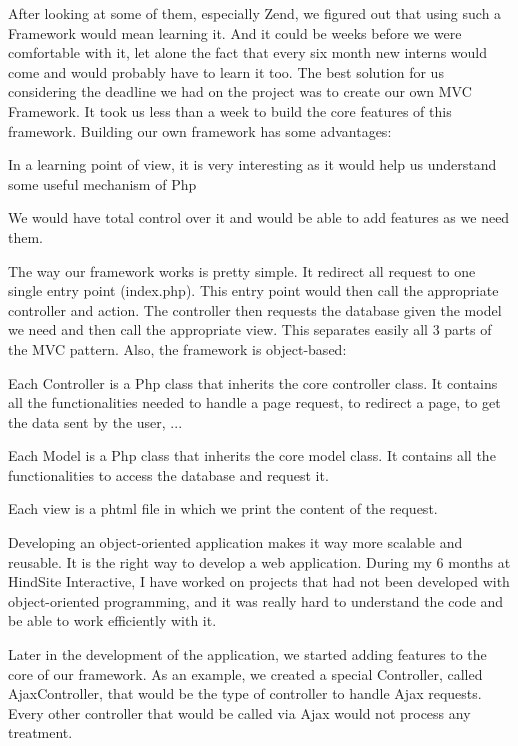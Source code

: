 After looking at some of them, especially Zend, we figured out that using such a Framework would mean learning it. And it could be weeks before we were comfortable with it, let alone the fact that every six month new interns would come and would probably have to learn it too. The best solution for us considering the deadline we had on the project was to create our own MVC Framework. It took us less than a week to build the core features of this framework. Building our own framework has some advantages:
\begin{itemize*}
\item In a learning point of view, it is very interesting as it would help us understand some useful mechanism of Php
\item We would have total control over it and would be able to add features as we need them.
\end{itemize*}

The way our framework works is pretty simple. It redirect all request to one single entry point (index.php). This entry point would then call the appropriate controller and action. The controller then requests the database given the model we need and then call the appropriate view. This separates easily all 3 parts of the MVC pattern.
Also, the framework is object-based: 
\begin{itemize*}
\item Each Controller is a Php class that inherits the core controller class. It contains all the functionalities needed to handle a page request, to redirect a page, to get the data sent by the user, ...
\item Each Model is a Php class that inherits the core model class. It contains all the functionalities to access the database and request it.
\item Each view is a phtml file in which we print the content of the request.
\end{itemize*}

Developing an object-oriented application makes it way more scalable and reusable. It is the right way to develop a web application. During my 6 months at HindSite Interactive, I have worked on projects that had not been developed with object-oriented programming, and it was really hard to understand the code and be able to work efficiently with it. 

Later in the development of the application, we started adding features to the core of our framework. As an example, we created a special Controller, called AjaxController, that would be the type of controller to handle Ajax requests. Every other controller that would be called via Ajax would not process any treatment.

